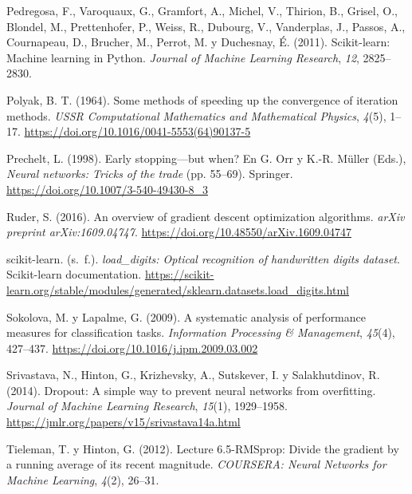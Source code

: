 \documentclass[12pt,letterpaper]{article}
\newcommand{\refapa}[1]{\par\noindent\hangindent=0.5in\hangafter=1 #1\par}
\begin{document}
\refapa{Pedregosa, F., Varoquaux, G., Gramfort, A., Michel, V., Thirion, B., Grisel, O., Blondel, M., Prettenhofer, P., Weiss, R., Dubourg, V., Vanderplas, J., Passos, A., Cournapeau, D., Brucher, M., Perrot, M. y Duchesnay, É. (2011). Scikit-learn: Machine learning in Python. \textit{Journal of Machine Learning Research}, \textit{12}, 2825--2830.}
\refapa{Polyak, B. T. (1964). Some methods of speeding up the convergence of iteration methods. \textit{USSR Computational Mathematics and Mathematical Physics}, \textit{4}(5), 1--17. \url{https://doi.org/10.1016/0041-5553(64)90137-5}}
\refapa{Prechelt, L. (1998). Early stopping---but when? En G. Orr y K.-R. Müller (Eds.), \textit{Neural networks: Tricks of the trade} (pp. 55--69). Springer. \url{https://doi.org/10.1007/3-540-49430-8_3}}
\refapa{Ruder, S. (2016). An overview of gradient descent optimization algorithms. \textit{arXiv preprint arXiv:1609.04747}. \url{https://doi.org/10.48550/arXiv.1609.04747}}
\refapa{scikit-learn. (s.~f.). \textit{load\_digits: Optical recognition of handwritten digits dataset}. Scikit-learn documentation. \url{https://scikit-learn.org/stable/modules/generated/sklearn.datasets.load_digits.html}}
\refapa{Sokolova, M. y Lapalme, G. (2009). A systematic analysis of performance measures for classification tasks. \textit{Information Processing \& Management}, \textit{45}(4), 427--437. \url{https://doi.org/10.1016/j.ipm.2009.03.002}}
\refapa{Srivastava, N., Hinton, G., Krizhevsky, A., Sutskever, I. y Salakhutdinov, R. (2014). Dropout: A simple way to prevent neural networks from overfitting. \textit{Journal of Machine Learning Research}, \textit{15}(1), 1929--1958. \url{https://jmlr.org/papers/v15/srivastava14a.html}}
\refapa{Tieleman, T. y Hinton, G. (2012). Lecture 6.5-RMSprop: Divide the gradient by a running average of its recent magnitude. \textit{COURSERA: Neural Networks for Machine Learning}, \textit{4}(2), 26--31.}
\end{document}
